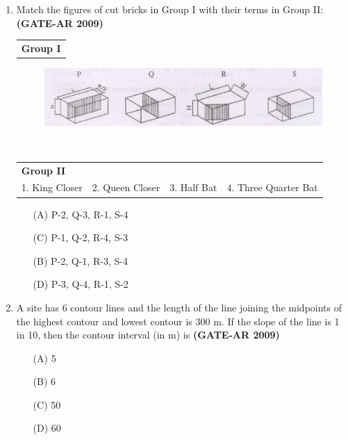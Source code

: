 \documentclass[a4paper,10pt]{article}
\begin{document}
\begin{enumerate}
    \item Match the figures of cut bricks in Group I with their terms in Group II: \hfill \textbf{(GATE-AR 2009)} \\
    \begin{tabular}{ p }
	\textbf{Group I} \\
	\end{tabular}
	\begin{figure}[h!]
        \centering
        \includegraphics[width=0.5\linewidth]{figs/img_01.jpg}
        \label{fig:Img01}
	\end{figure} \\
	\begin{tabular}{ p p p p }
	\textbf{Group II} & & & \\
	1. King Closer & 2. Queen Closer & 3. Half Bat & 4. Three Quarter Bat \\
	\end{tabular}
	\begin{multicols}{2}
	\begin{itemize}
        \item[(A)] P-2, Q-3, R-1, S-4
        \item[(C)] P-1, Q-2, R-4, S-3
        \item[(B)] P-2, Q-1, R-3, S-4
        \item[(D)] P-3, Q-4, R-1, S-2
    \end{itemize}
	\end{multicols}

    \item A site has 6 contour lines and the length of the line joining the midpoints of the highest contour and lowest contour is 300 m. If the slope of the line is 1 in 10, then the contour interval (in m) is \hfill \textbf{(GATE-AR 2009)}
    \begin{multicols}{4}
	\begin{itemize}
        \item[(A)] 5
        \item[(B)] 6
        \item[(C)] 50
        \item[(D)] 60
    \end{itemize}
	\end{multicols}
	

\end{enumerate}
\end{document}
